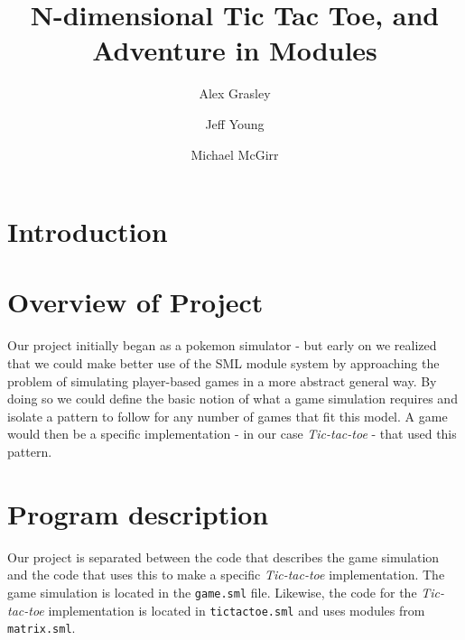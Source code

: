 \documentclass[9pt,letterpaper]{extarticle}
\title{N-dimensional Tic Tac Toe, and Adventure in Modules}
\author{Alex Grasley \and Jeff Young \and Michael McGirr}
\date{}
\begin{document}
	\maketitle

  \section{Introduction}
  \section{Overview of Project}

  Our project initially began as a pokemon simulator - but early on we realized
  that we could make better use of the SML module system by approaching the
  problem of simulating player-based games in a more abstract general way.
  By doing so we could define the basic notion of what a game simulation requires
  and isolate a pattern to follow for any number of games that fit this
  model.
  A game would then be a specific implementation - in our case
  \textit{Tic-tac-toe} - that used this pattern.

  \section{Program description}
  
  Our project is separated between the code that describes the game simulation
  and the code that uses this to make a specific \textit{Tic-tac-toe} implementation.
  The game simulation is located in the \texttt{game.sml} file. Likewise, the
  code for the \textit{Tic-tac-toe} implementation is located in
  \texttt{tictactoe.sml} and uses modules from \texttt{matrix.sml}.
\end{document}
